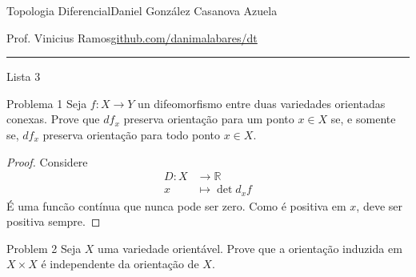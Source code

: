 
%




\begin{minipage}{\textwidth}
	\begin{minipage}{1\textwidth}
		Topologia Diferencial\hfill Daniel González Casanova Azuela
		
		{Prof. Vinicius Ramos\hfill\href{https://github.com/danimalabares/dt}{github.com/danimalabares/dt}}
	\end{minipage}
\end{minipage}\vspace{.2cm}\hrule

\vspace{10pt}
{\huge Lista 3}

\vspace{1em}
\begin{thing1}{Problema 1}\label{prob:1}\leavevmode
Seja \(f: X \to Y\) un difeomorfismo entre duas variedades orientadas conexas. Prove que \(df_x\) preserva orientação para um ponto \(x \in X\) se, e somente se, \(df_x\) preserva orientação para todo ponto \(x \in X\).
\end{thing1}

\begin{proof}\leavevmode
Considere
\begin{align*}
	D: X &\longrightarrow \mathbb{R} \\
	x &\longmapsto \det d_xf
\end{align*}
É uma funcão contínua que nunca pode ser zero. Como é positiva em \(x\), deve ser positiva sempre.

\end{proof}

\begin{thing1}{Problem 2}\label{prob:2}\leavevmode
Seja \(X\) uma variedade orientável. Prove que a orientação induzida em \(X \times X\) é independente da orientação de \(X\).
\end{thing1}

